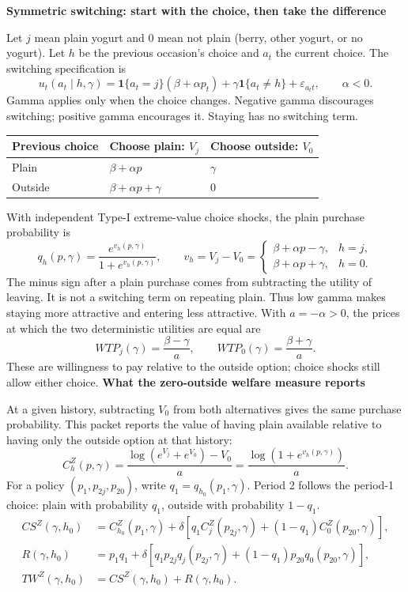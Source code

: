 \documentclass[11pt]{article}
\newcommand{\titleline}[1]{{\Large\bfseries #1}\par\vspace{3pt}}
\begin{document}
\newpage
\titleline{Symmetric switching: start with the choice, then take the difference}
\small
Let $j$ mean plain yogurt and $0$ mean not plain (berry, other yogurt, or no yogurt).
Let $h$ be the previous occasion's choice and $a_t$ the current choice.
The switching specification is
\[
u_t(a_t\mid h,\gamma)
=\mathbf1\{a_t=j\}(\beta+\alpha p_t)
+\gamma\mathbf1\{a_t\ne h\}+\varepsilon_{a_t t},\qquad \alpha<0.
\]
Gamma applies only when the choice changes. Negative gamma discourages switching;
positive gamma encourages it. Staying has no switching term.
\begin{center}
\renewcommand{\arraystretch}{1.4}
\begin{tabular}{lll}
\toprule
Previous choice & Choose plain: $V_j$ & Choose outside: $V_0$\\
\midrule
Plain & $\beta+\alpha p$ & $\gamma$\\
Outside & $\beta+\alpha p+\gamma$ & $0$\\
\bottomrule
\end{tabular}
\end{center}
With independent Type-I extreme-value choice shocks, the plain purchase probability is
\[
q_h(p,\gamma)=\frac{e^{v_h(p,\gamma)}}{1+e^{v_h(p,\gamma)}},\qquad
v_h=V_j-V_0=
\begin{cases}
\beta+\alpha p-\gamma,&h=j,\\
\beta+\alpha p+\gamma,&h=0.
\end{cases}
\]
The minus sign after a plain purchase comes from subtracting the utility of leaving.
It is not a switching term on repeating plain. Thus low gamma makes staying more
attractive and entering less attractive. With $a=-\alpha>0$, the prices at which the
two deterministic utilities are equal are
\[
WTP_j(\gamma)=\frac{\beta-\gamma}{a},\qquad
WTP_0(\gamma)=\frac{\beta+\gamma}{a}.
\]
These are willingness to pay relative to the outside option; choice shocks still allow either choice.
\newpage
\titleline{What the zero-outside welfare measure reports}
\small
At a given history, subtracting $V_0$ from both alternatives gives the same purchase
probability. This packet reports the value of having plain available relative to
having only the outside option at that history:
\[
C_h^Z(p,\gamma)
=\frac{\log(e^{V_j}+e^{V_0})-V_0}{a}
=\frac{\log(1+e^{v_h(p,\gamma)})}{a}.
\]
For a policy $(p_1,p_{2j},p_{20})$, write $q_1=q_{h_0}(p_1,\gamma)$.
Period 2 follows the period-1 choice: plain with probability $q_1$, outside with probability $1-q_1$.
\begin{align*}
CS^Z(\gamma,h_0)
&=C_{h_0}^Z(p_1,\gamma)
+\delta\left[q_1C_j^Z(p_{2j},\gamma)+(1-q_1)C_0^Z(p_{20},\gamma)\right],\\
R(\gamma,h_0)
&=p_1q_1+\delta\left[q_1p_{2j}q_j(p_{2j},\gamma)
+(1-q_1)p_{20}q_0(p_{20},\gamma)\right],\\
TW^Z(\gamma,h_0)&=CS^Z(\gamma,h_0)+R(\gamma,h_0).
\end{align*}
\end{document}

